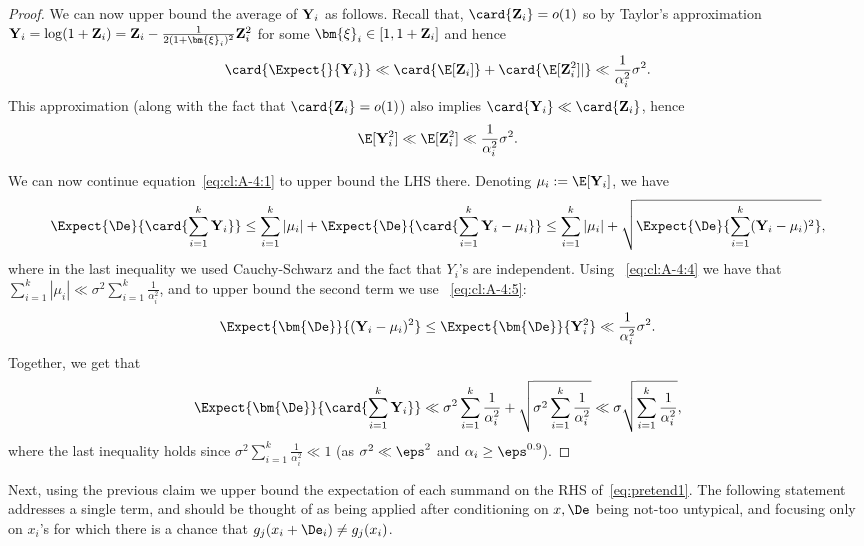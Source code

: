 \begin{proof}
     We can now upper bound the average of ${\bf Y}_i$ as follows. Recall that, $\card{{\bf Z}_i} = o(1)$ so by Taylor's approximation
     ${\bf Y}_i = \log(1+{\bf Z}_i) = {\bf Z}_i - \frac{1}{2(1+\bm{\xi}_i)^2} {\bf Z}_i^2$ for some $\bm{\xi}_i\in [1,1+{\bf Z}_i]$ and hence
	  \begin{equation}
	 \card{\Expect{}{{\bf Y}_i}} \ll \card{\E[{\bf Z}_i]} + \card{\E[{\bf Z}_i^2]|} \ll \frac{1}{\alpha_i^2}\sigma^2.
	 \label{eq:cl:A-4:4}
	 \end{equation}
	 This approximation (along with the fact that $\card{{\bf Z}_i} = o(1)$) also implies $\card{{\bf Y}_i}\ll \card{{\bf Z}_i}$, hence
	 \begin{equation}
	 \E[{\bf Y}_i^2] \ll \E[{\bf Z}_i^2]  \ll \frac{1}{\alpha_i^2}\sigma^2.
	 \label{eq:cl:A-4:5}
	 \end{equation}
	
	 We can now continue equation~\eqref{eq:cl:A-4:1} to upper bound the LHS there.
     Denoting $\mu_i:=\E[{\bf Y}_i]$, we have
	 \begin{align*}
	 \Expect{\De}{\card{\sum_{i=1}^k {\bf Y}_i}}
     \leq \sum_{i=1}^k |\mu_i|  +  \Expect{\De}{\card{\sum_{i=1}^k {\bf Y}_i-\mu_i}}
     \le \sum_{i=1}^k |\mu_i|
	 + \sqrt{\Expect{\De}{\sum_{i=1}^k ({\bf Y}_i-\mu_i)^2}},
	 \end{align*}
     where in the last inequality we used Cauchy-Schwarz and the fact that $Y_i$'s are independent.
     Using ~\eqref{eq:cl:A-4:4} we have that $\sum_{i=1}^k |\mu_i|\ll \sigma^2\sum_{i=1}^k \frac{1}{\alpha_i^2}$,
     and to upper bound the second term we use ~\eqref{eq:cl:A-4:5}:
     \[
     \Expect{\bm{\De}}{({\bf Y}_i-\mu_i)^2}
     \leq \Expect{\bm{\De}}{{\bf Y}_i^2}
     \ll \frac{1}{\alpha_i^2}\sigma^2.
     \]
     Together, we get that
     \[
     \Expect{\bm{\De}}{\card{\sum_{i=1}^k {\bf Y}_i}}
     \ll \sigma^2\sum_{i=1}^k \frac{1}{\alpha_i^2} + \sqrt{\sigma^2\sum_{i=1}^k \frac{1}{\alpha_i^2}}
     \ll \sigma  \sqrt{\sum_{i=1}^k \frac{1}{\alpha_i^2}},
     \]
     where the last inequality holds since
     $\sigma^2\sum_{i=1}^k \frac{1}{\alpha_i^2}\ll 1$
     (as $\sigma^2\ll \eps^2$ and $\alpha_i\geq \eps^{0.9}$).
\end{proof}


Next, using the previous claim we upper bound the expectation of each summand on the RHS of~\eqref{eq:pretend1}.
The following statement addresses a single term, and should be thought of as being applied after conditioning on
$x,\De$ being not-too untypical, and focusing only on $x_i$'s for which there is a chance that
$g_j(x_i + \De_i)\neq g_j(x_i)$.

